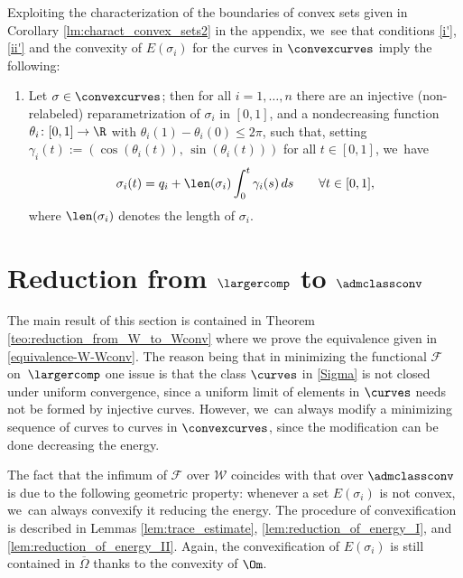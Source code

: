 \begin{remark}\label{rem:condition_P}
Exploiting the characterization of the boundaries of convex sets
given in Corollary \ref{lm:charact_convex_sets2} in the appendix, we~see that conditions \ref{i'}, \ref{ii'} and the convexity of $E(\sigma_i)$ for the curves in $\convexcurves$ imply the following:

\begin{enumerate}[label=(P),wide]
\item\label{(P)} Let $\sigma\in \convexcurves$; then for all $i=1,\dots, n$ there are an injective (non-relabeled) reparametrization of $\sigma_i$ in $[0,1]$, and a
nondecreasing function $\theta_i\colon[0,1]\to\R$
with $\theta_i(1)-\theta_i(0)\le2\pi$,
such that, setting $\gamma_i(t):=(\cos(\theta_i(t)),\,\sin(\theta_i(t)))$ for all $t\in[0,1]$, we~have
\begin{equation*}
\sigma_i(t)=q_i+\len(\sigma_i)\int_0^t\gamma_i(s)\,ds\quad \quad\forall t\in[0,1],
\end{equation*}
where $\len(\sigma_i)$ denotes the length of $\sigma_i$.
\end{enumerate}
\end{remark}

\section{ Reduction from \texorpdfstring{$\largercomp$ to $\admclassconv$}{W}}
\label{sec:reduction_from_W_to_Wconv}

The main result of this section is contained in Theorem
\ref{teo:reduction_from_W_to_Wconv} where we prove the equivalence given in \eqref{equivalence-W-Wconv}. The reason being that in minimizing the functional
${\mathcal F}$ on~$\largercomp$ one issue is that the class $\curves$ in \eqref{Sigma}
is not closed under uniform convergence, since
a uniform limit of elements
in $\curves$ needs not be formed by injective curves. {However, we~can always modify a minimizing sequence of curves to curves in $\convexcurves$, since the modification can be done decreasing the energy.}

The fact that the infimum of $\mathcal F$ over $\mathcal W$ coincides with that over $\admclassconv$ is due to the following geometric property: whenever a set $E(\sigma_i)$ is not convex, we~can always convexify it reducing the energy. The procedure of convexification is described in Lemmas \ref{lem:trace_estimate}, \ref{lem:reduction_of_energy_I}, and \ref{lem:reduction_of_energy_II}. Again, the convexification of $E(\sigma_i)$ is still contained in $\overline\Omega$ thanks to the convexity of $\Om$.

